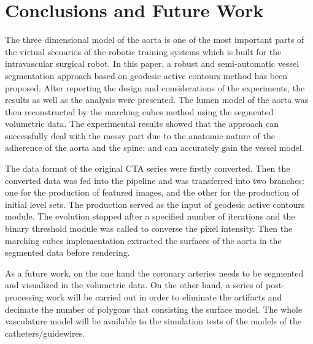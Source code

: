 
\section{Conclusions and Future Work}

The three dimensional model of the aorta is one of the most important parts of the virtual scenarios of the robotic training systems which is built for the intravascular surgical robot.
In this paper, a robust and semi-automatic vessel segmentation approach based on geodesic active contours method has been proposed.
After reporting the design and considerations of the experiments, the results as well as the analysis were presented.
The lumen model of the aorta was then reconstructed by the marching cubes method using the segmented volumetric data.
The experimental results showed that the approach can successfully deal with the messy part due to the anatomic nature of the adherence of the aorta and the spine; and can accurately gain the vessel model.

The data format of the original CTA series were firstly converted.
Then the converted data was fed into the pipeline and was transferred into two branches: one for the production of featured images, and the other for the production of initial level sets.
The production served as the input of geodesic active contours module.
The evolution stopped after a specified number of iterations and the binary threshold module was called to converse the pixel intensity.
Then the marching cubes implementation extracted the surfaces of the aorta in the segmented data before rendering.

As a future work, on the one hand the coronary arteries needs to be segmented and visualized in the volumetric data.
On the other hand, a series of post-processing work will be carried out in order to eliminate the artifacts and decimate the number of polygons that consisting the surface model.
The whole vasculature model will be available to the simulation tests of the models of the catheters/guidewires.
